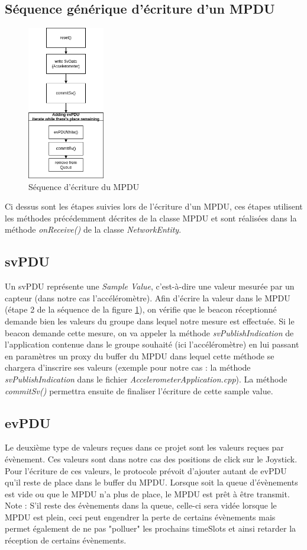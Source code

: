 \documentclass{report}
\begin{document}
\subsection{Séquence générique d'écriture d'un MPDU}
\begin{figure}[H]
    \centering
    \includegraphics[width= 0.3\textwidth]{Images/MPDUWrite.png}
    \caption{Séquence d'écriture du MPDU}
    \label{fig:MPDUSequence}
\end{figure}
Ci dessus sont les étapes suivies lors de l'écriture d'un MPDU, ces étapes utilisent les méthodes précédemment décrites de la classe MPDU et sont réalisées dans la méthode \textit{onReceive()} de la classe \textit{NetworkEntity}. 

\subsection{svPDU}
Un svPDU représente une \textit{Sample Value}, c'est-à-dire une valeur mesurée par un capteur (dans notre cas l'accéléromètre). Afin d'écrire la valeur dans le MPDU (étape 2 de la séquence de la figure \ref{fig:MPDUSequence}), on vérifie que le beacon réceptionné demande bien les valeurs du groupe dans lequel notre mesure est effectuée. Si le beacon demande cette mesure, on va appeler la méthode \textit{svPublishIndication} de l'application contenue dans le groupe souhaité (ici l'accéléromètre) en lui passant en paramètres un proxy du buffer du MPDU dans lequel cette méthode se chargera d'inscrire ses valeurs (exemple pour notre cas : la méthode \textit{svPublishIndication} dans le fichier \textit{AccelerometerApplication.cpp}). La méthode \textit{commitSv()} permettra ensuite de finaliser l'écriture de cette sample value.
\subsection{evPDU}
\label{subsection:evPDU}
Le deuxième type de valeurs reçues dans ce projet sont les valeurs reçues par évènement. Ces valeurs sont dans notre cas des positions de click sur le Joystick. Pour l'écriture de ces valeurs, le protocole prévoit d'ajouter autant de evPDU qu'il reste de place dans le buffer du MPDU. Lorsque soit la queue d'évènements est vide ou que le MPDU n'a plus de place, le MPDU est prêt à être transmit. Note : S'il reste des évènements dans la queue, celle-ci sera vidée lorsque le MPDU est plein, ceci peut engendrer la perte de certains évènements mais permet également de ne pas "polluer" les prochains timeSlots et ainsi retarder la réception de certains évènements.
\end{document}
